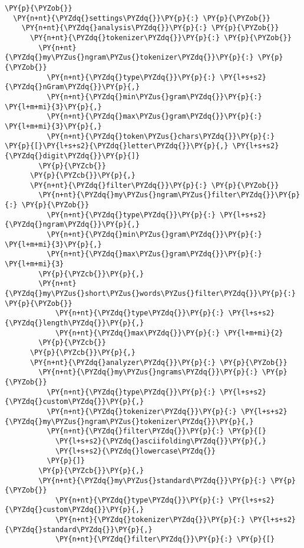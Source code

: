 \begin{Verbatim}[commandchars=\\\{\}]
\PY{p}{\PYZob{}}
  \PY{n+nt}{\PYZdq{}settings\PYZdq{}}\PY{p}{:} \PY{p}{\PYZob{}}
    \PY{n+nt}{\PYZdq{}analysis\PYZdq{}}\PY{p}{:} \PY{p}{\PYZob{}}
      \PY{n+nt}{\PYZdq{}tokenizer\PYZdq{}}\PY{p}{:} \PY{p}{\PYZob{}}
        \PY{n+nt}{\PYZdq{}my\PYZus{}ngram\PYZus{}tokenizer\PYZdq{}}\PY{p}{:} \PY{p}{\PYZob{}}
          \PY{n+nt}{\PYZdq{}type\PYZdq{}}\PY{p}{:} \PY{l+s+s2}{\PYZdq{}nGram\PYZdq{}}\PY{p}{,}
          \PY{n+nt}{\PYZdq{}min\PYZus{}gram\PYZdq{}}\PY{p}{:} \PY{l+m+mi}{3}\PY{p}{,}
          \PY{n+nt}{\PYZdq{}max\PYZus{}gram\PYZdq{}}\PY{p}{:} \PY{l+m+mi}{3}\PY{p}{,}
          \PY{n+nt}{\PYZdq{}token\PYZus{}chars\PYZdq{}}\PY{p}{:} \PY{p}{[}\PY{l+s+s2}{\PYZdq{}letter\PYZdq{}}\PY{p}{,} \PY{l+s+s2}{\PYZdq{}digit\PYZdq{}}\PY{p}{]}
        \PY{p}{\PYZcb{}}
      \PY{p}{\PYZcb{}}\PY{p}{,}
      \PY{n+nt}{\PYZdq{}filter\PYZdq{}}\PY{p}{:} \PY{p}{\PYZob{}}
        \PY{n+nt}{\PYZdq{}my\PYZus{}ngram\PYZus{}filter\PYZdq{}}\PY{p}{:} \PY{p}{\PYZob{}}
          \PY{n+nt}{\PYZdq{}type\PYZdq{}}\PY{p}{:} \PY{l+s+s2}{\PYZdq{}ngram\PYZdq{}}\PY{p}{,}
          \PY{n+nt}{\PYZdq{}min\PYZus{}gram\PYZdq{}}\PY{p}{:} \PY{l+m+mi}{3}\PY{p}{,}
          \PY{n+nt}{\PYZdq{}max\PYZus{}gram\PYZdq{}}\PY{p}{:} \PY{l+m+mi}{3}
        \PY{p}{\PYZcb{}}\PY{p}{,}
        \PY{n+nt}{\PYZdq{}my\PYZus{}short\PYZus{}words\PYZus{}filter\PYZdq{}}\PY{p}{:} \PY{p}{\PYZob{}}
            \PY{n+nt}{\PYZdq{}type\PYZdq{}}\PY{p}{:} \PY{l+s+s2}{\PYZdq{}length\PYZdq{}}\PY{p}{,}
            \PY{n+nt}{\PYZdq{}max\PYZdq{}}\PY{p}{:} \PY{l+m+mi}{2}
        \PY{p}{\PYZcb{}}
      \PY{p}{\PYZcb{}}\PY{p}{,}
      \PY{n+nt}{\PYZdq{}analyzer\PYZdq{}}\PY{p}{:} \PY{p}{\PYZob{}}
        \PY{n+nt}{\PYZdq{}my\PYZus{}ngrams\PYZdq{}}\PY{p}{:} \PY{p}{\PYZob{}}
          \PY{n+nt}{\PYZdq{}type\PYZdq{}}\PY{p}{:} \PY{l+s+s2}{\PYZdq{}custom\PYZdq{}}\PY{p}{,}
          \PY{n+nt}{\PYZdq{}tokenizer\PYZdq{}}\PY{p}{:} \PY{l+s+s2}{\PYZdq{}my\PYZus{}ngram\PYZus{}tokenizer\PYZdq{}}\PY{p}{,}
          \PY{n+nt}{\PYZdq{}filter\PYZdq{}}\PY{p}{:} \PY{p}{[}
            \PY{l+s+s2}{\PYZdq{}asciifolding\PYZdq{}}\PY{p}{,}
            \PY{l+s+s2}{\PYZdq{}lowercase\PYZdq{}}
          \PY{p}{]}
        \PY{p}{\PYZcb{}}\PY{p}{,}
        \PY{n+nt}{\PYZdq{}my\PYZus{}standard\PYZdq{}}\PY{p}{:} \PY{p}{\PYZob{}}
            \PY{n+nt}{\PYZdq{}type\PYZdq{}}\PY{p}{:} \PY{l+s+s2}{\PYZdq{}custom\PYZdq{}}\PY{p}{,}
            \PY{n+nt}{\PYZdq{}tokenizer\PYZdq{}}\PY{p}{:} \PY{l+s+s2}{\PYZdq{}standard\PYZdq{}}\PY{p}{,}
            \PY{n+nt}{\PYZdq{}filter\PYZdq{}}\PY{p}{:} \PY{p}{[}

\end{Verbatim}
